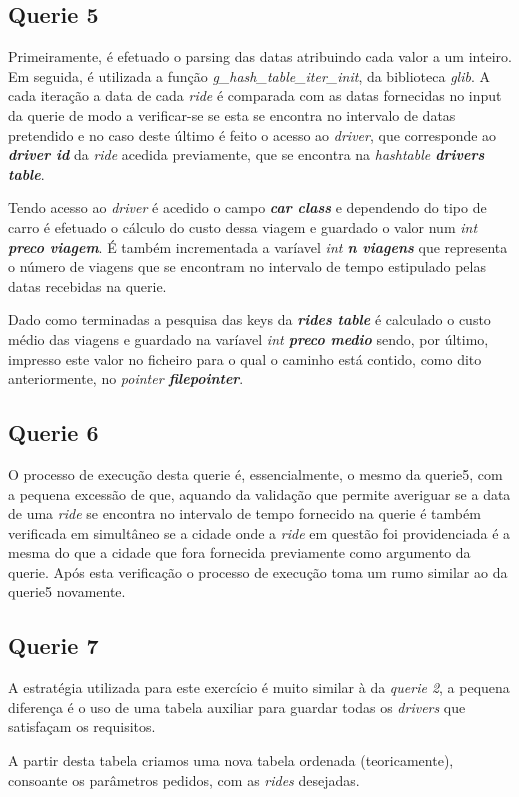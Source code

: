 \documentclass[12pt,a4paper]{article}
\begin{document}
\subsection{Querie 5}
    \par Primeiramente, é efetuado o parsing das datas atribuindo cada valor a um inteiro. Em seguida, é utilizada a função \textit{g\_hash\_table\_iter\_init}, da biblioteca \textit{glib}. A cada iteração a data de cada \textit{ride} é comparada com as datas fornecidas no input da querie de modo a verificar-se se esta se encontra no intervalo de datas pretendido e no caso deste último é feito o acesso ao \textit{driver}, que corresponde ao \textit{\textbf{driver id}} da \textit{ride} acedida previamente, que se encontra na \textit{hashtable \textbf{drivers table}}. 
    \par Tendo acesso ao \textit{driver} é acedido o campo \textit{\textbf{car class}} e dependendo do tipo de carro é efetuado o cálculo do custo dessa viagem e guardado o valor num \textit{int \textbf{preco viagem}}. É também incrementada a varíavel \textit{int \textbf{n viagens}} que representa o número de viagens que se encontram no intervalo de tempo estipulado pelas datas recebidas na querie.
    \par Dado como terminadas a pesquisa das keys da \textit{\textbf{rides table}} é calculado o custo médio das viagens e guardado na varíavel \textit{int \textbf{preco medio}} sendo, por último, impresso este valor no ficheiro para o qual o caminho está contido, como dito anteriormente, no \textit{pointer \textbf{filepointer}}.
    
\subsection{Querie 6}
    \par O processo de execução desta querie é, essencialmente, o mesmo da querie5, com a pequena excessão de que, aquando da validação que permite averiguar se a data de uma \textit{ride} se encontra no intervalo de tempo fornecido na querie é também verificada em simultâneo se a cidade onde a \textit{ride} em questão foi providenciada é a mesma do que a cidade que fora fornecida previamente como argumento da querie.
    Após esta verificação o processo de execução toma um rumo similar ao da querie5 novamente.
\subsection{Querie 7}
    \par A estratégia utilizada para este exercício é muito similar à da \textit{querie 2}, a pequena diferença é o uso de uma tabela auxiliar para guardar todas os \textit{drivers} que satisfaçam os requisitos.
    \par A partir desta tabela criamos uma nova tabela ordenada (teoricamente), consoante os parâmetros pedidos, com as \textit{rides} desejadas.
    
\end{document}
